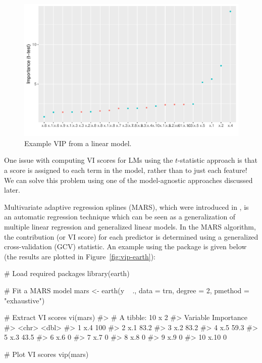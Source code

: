 \begin{figure}[!htb]
  \centering 
  \includegraphics[width=1\linewidth]{figures/vip-step} 
  \caption{Example VIP from a linear model.}
  \label{fig:vip-step}
\end{figure}

One issue with computing VI scores for LMs using the $t$-statistic approach is that a score is assigned to each term in the model, rather than to just each feature! We can solve this problem using one of the model-agnostic approaches discussed later.

Multivariate adaptive regression splines (MARS), which were introduced in \citet{multivariate-friedman-1991}, is an automatic regression technique which can be seen as a generalization of multiple linear regression and generalized linear models. In the MARS algorithm, the contribution (or VI score) for each predictor is determined using a generalized cross-validation (GCV) statistic. An example using the  package \citep{earth-pkg} is given below (the results are plotted in Figure~\ref{fig:vip-earth}):

\begin{example}
# Load required packages
library(earth)

# Fit a MARS model
mars <- earth(y ~ ., data = trn, degree = 2, pmethod = "exhaustive")

# Extract VI scores
vi(mars)
#> # A tibble: 10 x 2
#>    Variable Importance
#>    <chr>         <dbl>
#>  1 x.4           100  
#>  2 x.1            83.2
#>  3 x.2            83.2
#>  4 x.5            59.3
#>  5 x.3            43.5
#>  6 x.6             0  
#>  7 x.7             0  
#>  8 x.8             0  
#>  9 x.9             0  
#> 10 x.10            0

# Plot VI scores
vip(mars)
\end{example}


